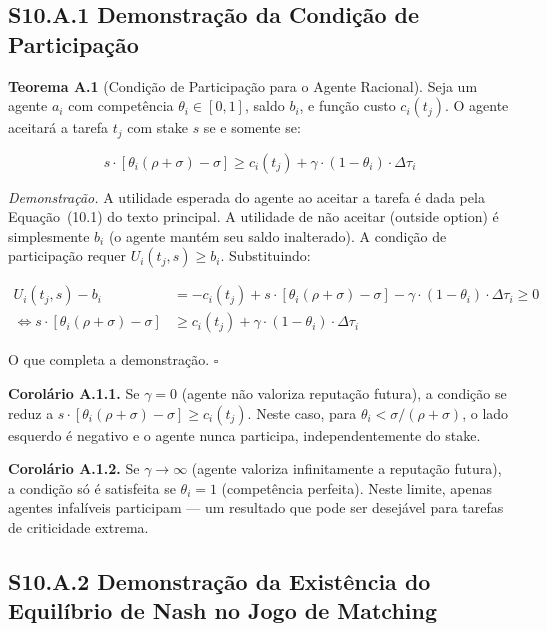 \subsection*{S10.A.1 Demonstração da Condição de Participação}

\textbf{Teorema A.1} (Condição de Participação para o Agente Racional). Seja um agente $a_i$ com competência $\theta_i \in [0,1]$, saldo $b_i$, e função custo $c_i(t_j)$. O agente aceitará a tarefa $t_j$ com stake $s$ se e somente se:

\begin{equation}
s \cdot \left[\theta_i(\rho + \sigma) - \sigma\right] \geq c_i(t_j) + \gamma \cdot (1 - \theta_i) \cdot \Delta\tau_i
\end{equation}

\textit{Demonstração.} A utilidade esperada do agente ao aceitar a tarefa é dada pela Equação~(10.1) do texto principal. A utilidade de não aceitar (outside option) é simplesmente $b_i$ (o agente mantém seu saldo inalterado). A condição de participação requer $U_i(t_j, s) \geq b_i$. Substituindo:

\begin{align}
U_i(t_j, s) - b_i &= -c_i(t_j) + s \cdot [\theta_i(\rho + \sigma) - \sigma] - \gamma \cdot (1 - \theta_i) \cdot \Delta\tau_i \geq 0 \\
\iff s \cdot [\theta_i(\rho + \sigma) - \sigma] &\geq c_i(t_j) + \gamma \cdot (1 - \theta_i) \cdot \Delta\tau_i
\end{align}

O que completa a demonstração. \hfill $\square$

\textbf{Corolário A.1.1.} Se $\gamma = 0$ (agente não valoriza reputação futura), a condição se reduz a $s \cdot [\theta_i(\rho + \sigma) - \sigma] \geq c_i(t_j)$. Neste caso, para $\theta_i < \sigma/(\rho+\sigma)$, o lado esquerdo é negativo e o agente nunca participa, independentemente do stake.

\textbf{Corolário A.1.2.} Se $\gamma \to \infty$ (agente valoriza infinitamente a reputação futura), a condição só é satisfeita se $\theta_i = 1$ (competência perfeita). Neste limite, apenas agentes infalíveis participam --- um resultado que pode ser desejável para tarefas de criticidade extrema.

\subsection*{S10.A.2 Demonstração da Existência do Equilíbrio de Nash no Jogo de Matching}

